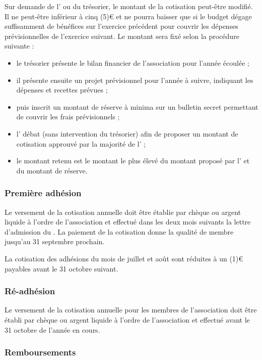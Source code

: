 \documentclass[a4paper,french,10pt]{article}
\begin{document}
Sur demande de l'\AG{} ou du trésorier, le montant de la cotisation peut-être modifié. Il ne peut-être inférieur à cinq (5)\euro{} et ne pourra baisser que si le budget dégage suffisamment de bénéfices sur l'exercice précédent pour couvrir les dépenses prévisionnelles de l'exercice suivant. Le montant sera fixé selon la procédure suivante :
\begin{itemize}
\item le trésorier présente le bilan financier de l'association pour l'année écoulée ;
\item il présente ensuite un projet prévisionnel pour l'année à suivre, indiquant les dépenses et recettes prévues ;
\item puis inscrit un montant de réserve à minima sur un bulletin secret permettant de couvrir les frais prévisionnels ;
\item l'\AG{} débat (sans intervention du trésorier) afin de proposer un montant de cotisation approuvé par la majorité de l'\AG{} ;
\item le montant retenu est le montant le plus élevé du montant proposé par l'\AG{} et du montant de réserve.
\end{itemize}

\subsubsection*{Première adhésion}

Le versement de la cotisation annuelle doit être établie par chèque ou argent liquide à l'ordre de l'association et effectué dans les deux mois suivants la lettre d'admission du \bureau{}. La paiement de la cotisation donne la qualité de membre jusqu'au 31 septembre prochain.

La cotisation des adhésions du mois de juillet et août sont réduites à un (1)\euro{} payables avant le 31 octobre suivant.

\subsubsection*{Ré-adhésion}

Le versement de la cotisation annuelle pour les membres de l'association doit être établi par chèque ou argent liquide à l'ordre de l'association et effectué avant le 31 octobre de l'année en cours.

\subsubsection*{Remboursements}
\end{document}
